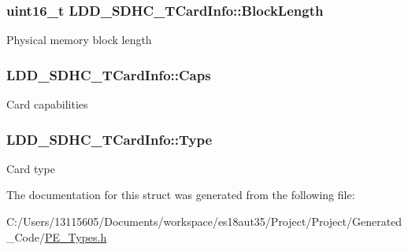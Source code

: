 \subsubsection[{Block\+Length}]{\setlength{\rightskip}{0pt plus 5cm}uint16\+\_\+t L\+D\+D\+\_\+\+S\+D\+H\+C\+\_\+\+T\+Card\+Info\+::\+Block\+Length}\label{struct_l_d_d___s_d_h_c___t_card_info_a46cbdea4ece83eeaa17410e9763cc3a9}
Physical memory block length \hypertarget{struct_l_d_d___s_d_h_c___t_card_info_a591c22d1aa49944325b35c63d2bf8199}{}
\subsubsection[{Caps}]{ L\+D\+D\+\_\+\+S\+D\+H\+C\+\_\+\+T\+Card\+Info\+::\+Caps}\label{struct_l_d_d___s_d_h_c___t_card_info_a591c22d1aa49944325b35c63d2bf8199}
Card capabilities \hypertarget{struct_l_d_d___s_d_h_c___t_card_info_ab2b86f6fe821778459edd351d08eb4bd}{}
\subsubsection[{Type}]{ L\+D\+D\+\_\+\+S\+D\+H\+C\+\_\+\+T\+Card\+Info\+::\+Type}\label{struct_l_d_d___s_d_h_c___t_card_info_ab2b86f6fe821778459edd351d08eb4bd}
Card type 

The documentation for this struct was generated from the following file\+:\begin{DoxyCompactItemize}
\item 
C\+:/\+Users/13115605/\+Documents/workspace/es18aut35/\+Project/\+Project/\+Generated\+\_\+\+Code/\hyperlink{_p_e___types_8h}{P\+E\+\_\+\+Types.\+h}\end{DoxyCompactItemize}
